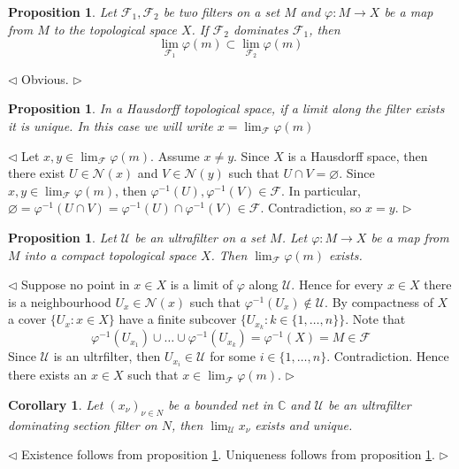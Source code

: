 \documentclass[12pt]{article}
\newtheorem{proposition}[theorem]{Proposition}
\newtheorem{corollary}[theorem]{Corollary}
\newenvironment{proof}{\par $\triangleleft$}{$\triangleright$}
\begin{document}
\begin{proposition}\label{PrChangeOfFilterInLimit} Let $\mathcal{F}_1, \mathcal{F}_2$ be two filters on a set $M$ and $\varphi:M\to X$ be a map from $M$ to the topological space $X$. If $\mathcal{F}_2$ dominates $\mathcal{F}_1$, then 
$$
\lim_{\mathcal{F}_1}\varphi(m)\subset\lim_{\mathcal{F}_2}\varphi(m)
$$
\end{proposition}
\begin{proof} Obvious.
\end{proof}

\begin{proposition}\label{RemUniqueLimitAlongFilter} In a Hausdorff topological space, if a limit along the filter exists it is unique. In this case we will write $x=\lim_{\mathcal{F}}\varphi(m)$
\end{proposition}
\begin{proof} Let $x,y\in\lim_{\mathcal{F}}\varphi(m)$. Assume $x\neq y$. Since $X$ is a Hausdorff space, then there exist $U\in\mathcal{N}(x)$ and $V\in\mathcal{N}(y)$ such that $U\cap V=\varnothing$. Since $x,y\in\lim_{\mathcal{F}}\varphi(m)$, then $\varphi^{-1}(U),\varphi^{-1}(V)\in\mathcal{F}$. In particular, $\varnothing=\varphi^{-1}(U\cap V)=\varphi^{-1}(U)\cap\varphi^{-1}(V)\in\mathcal{F}$. Contradiction, so $x=y$.
\end{proof}

\begin{proposition}\label{PrLimitAlongUltrafilterIntoTheCompact} Let $\mathcal{U}$ be an ultrafilter on a set $M$. Let $\varphi:M\to X$ be a map from $M$ into a compact topological space $X$. Then $\lim_{\mathcal{F}}\varphi(m)$ exists.
\end{proposition}
\begin{proof} Suppose no point in $x\in X$ is a limit of $\varphi$ along $\mathcal{U}$. Hence for every $x\in X$ there is a neighbourhood $U_x\in\mathcal{N}(x)$ such that $\varphi^{-1}(U_x)\notin\mathcal{U}$. By compactness of $X$ a cover $\{U_x:x\in X\}$ have a finite subcover $\{U_{x_k}:k\in\{1,\ldots,n\}\}$. Note that
$$
\varphi^{-1}(U_{x_1})\cup\ldots\cup\varphi^{-1}(U_{x_k})
=\varphi^{-1}(X)=M\in\mathcal{F}
$$
Since $\mathcal{U}$ is an ultrfilter, then $U_{x_i}\in\mathcal{U}$ for some $i\in\{1,\ldots,n\}$. Contradiction. Hence there exists an $x\in X$ such that $x\in\lim_{\mathcal{F}}\varphi(m)$.
\end{proof}

\begin{corollary}\label{PrLimitOfASequenceAlongUltrafilter} Let $(x_\nu)_{\nu\in N}$ be a bounded net in $\mathbb{C}$ and $\mathcal{U}$ be an ultrafilter dominating section filter on $N$, then $\lim_{\mathcal{U}}x_\nu$ exists and unique.
\end{corollary}
\begin{proof} Existence follows from proposition \ref{PrLimitAlongUltrafilterIntoTheCompact}. Uniqueness follows from proposition \ref{RemUniqueLimitAlongFilter}.
\end{proof}
\end{document}
